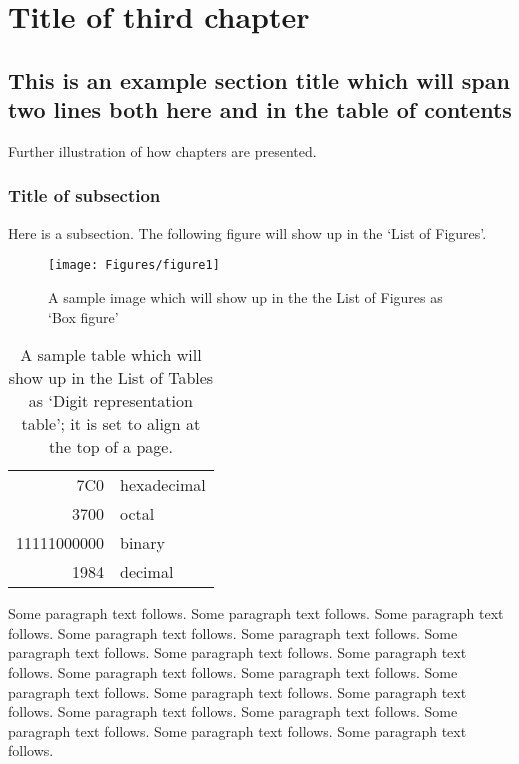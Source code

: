 \chapter{Title of third chapter}\label{CH_03}


\section{This is an example section title which will span two lines both here and in the table of contents}
Further illustration of how chapters are presented.


\subsection{Title of subsection}
Here is a subsection.  The following figure will show up in the `List of Figures'.

\begin{figure}[h] %
    \centering
    \texttt{[image: Figures/figure1]}
    \caption[Box figure]{A sample image which will show up in the the List of Figures as `Box figure'}
\end{figure}
\begin{table}[t]
    \centering
    \begin{tabular}{rl}
        \toprule
    7C0 & hexadecimal \\
    3700 & octal \\ \cline{2-2}
    11111000000 & binary \\
    \midrule\midrule
    1984 & decimal \\
    \bottomrule
    \end{tabular}
    \caption[Digit representation]{A sample table which will
        show up in the List of Tables as `Digit
        representation table'; it is set to align at the top of
        a page.}
\end{table}

Some paragraph text follows. Some paragraph text follows. Some
paragraph text follows. Some paragraph text follows. Some
paragraph text follows. Some paragraph text follows. Some
paragraph text follows. Some paragraph text follows. Some
paragraph text follows. Some paragraph text follows. Some
paragraph text follows. Some paragraph text follows. Some
paragraph text follows. Some paragraph text follows. Some
paragraph text follows. Some paragraph text follows. Some
paragraph text follows. Some paragraph text follows. 

